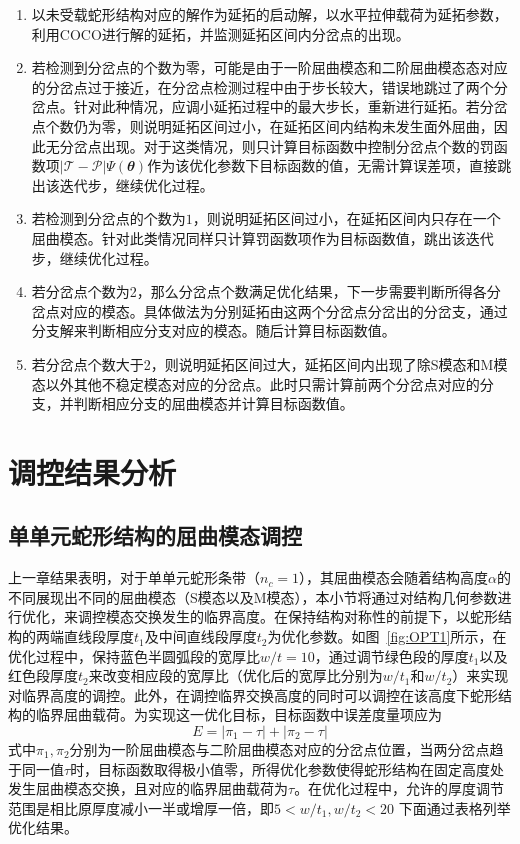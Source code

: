 \begin{enumerate}
	\item 以未受载蛇形结构对应的解作为延拓的启动解，以水平拉伸载荷为延拓参数，利用COCO进行解的延拓，并监测延拓区间内分岔点的出现。
	\item 若检测到分岔点的个数为零，可能是由于一阶屈曲模态和二阶屈曲模态态对应的分岔点过于接近，在分岔点检测过程中由于步长较大，错误地跳过了两个分岔点。针对此种情况，应调小延拓过程中的最大步长，重新进行延拓。若分岔点个数仍为零，则说明延拓区间过小，在延拓区间内结构未发生面外屈曲，因此无分岔点出现。对于这类情况，则只计算目标函数中控制分岔点个数的罚函数项$\left|\mathcal{T}-\mathcal{P}\right|\Psi\left(\mathbfit{\theta} \right)$作为该优化参数下目标函数的值，无需计算误差项，直接跳出该迭代步，继续优化过程。
	\item 若检测到分岔点的个数为$1$，则说明延拓区间过小，在延拓区间内只存在一个屈曲模态。针对此类情况同样只计算罚函数项作为目标函数值，跳出该迭代步，继续优化过程。
	\item 若分岔点个数为2，那么分岔点个数满足优化结果，下一步需要判断所得各分岔点对应的模态。具体做法为分别延拓由这两个分岔点分岔出的分岔支，通过分支解来判断相应分支对应的模态。随后计算目标函数值。
	\item 若分岔点个数大于2，则说明延拓区间过大，延拓区间内出现了除S模态和M模态以外其他不稳定模态对应的分岔点。此时只需计算前两个分岔点对应的分支，并判断相应分支的屈曲模态并计算目标函数值。
\end{enumerate}
\section{调控结果分析}
\subsection{单单元蛇形结构的屈曲模态调控}
上一章结果表明，对于单单元蛇形条带（$n_c=1$），其屈曲模态会随着结构高度$\alpha$的不同展现出不同的屈曲模态（S模态以及M模态），本小节将通过对结构几何参数进行优化，来调控模态交换发生的临界高度。在保持结构对称性的前提下，以蛇形结构的两端直线段厚度$t_1$及中间直线段厚度$t_2$为优化参数。如图~\ref{fig:OPT1}所示，在优化过程中，保持蓝色半圆弧段的宽厚比$w/t=10$，通过调节绿色段的厚度$t_1$以及红色段厚度$t_2$来改变相应段的宽厚比（优化后的宽厚比分别为$w/t_1$和$w/t_2$）来实现对临界高度的调控。此外，在调控临界交换高度的同时可以调控在该高度下蛇形结构的临界屈曲载荷。为实现这一优化目标，目标函数中误差度量项应为
\begin{equation}
	E=\left|\pi_{1}-\tau\right|+\left|\pi_{2}-\tau\right|
\end{equation}
式中$\pi_{1},\pi_{2}$分别为一阶屈曲模态与二阶屈曲模态对应的分岔点位置，当两分岔点趋于同一值$\tau$时，目标函数取得极小值零，所得优化参数使得蛇形结构在固定高度处发生屈曲模态交换，且对应的临界屈曲载荷为$\tau$。在优化过程中，允许的厚度调节范围是相比原厚度减小一半或增厚一倍，即$5<w/t_1,w/t_2<20$
下面通过表格列举优化结果。

